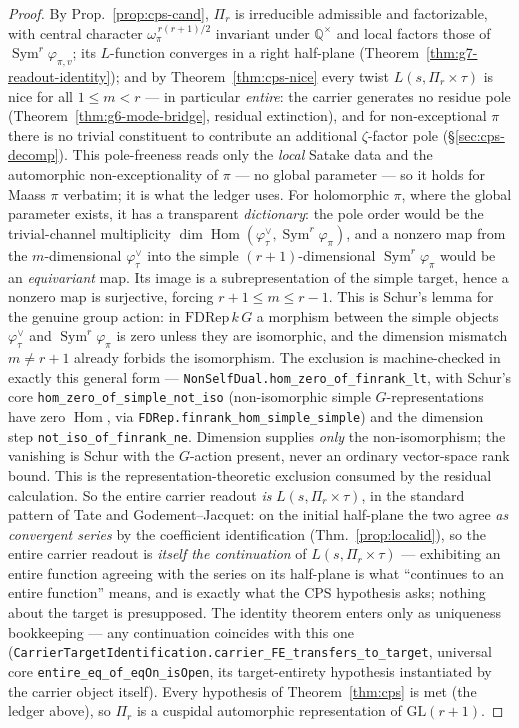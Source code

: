 \documentclass[11pt]{article}
\theoremstyle{definition}
\newcommand{\Sym}{\operatorname{Sym}}
\begin{document}
\begin{proof}
By Prop.~\ref{prop:cps-cand}, $\Pi_r$ is irreducible admissible and factorizable, with central character
$\omega_\pi^{\,r(r+1)/2}$ invariant under $\mathbb Q^\times$ and local factors those of $\Sym^r\varphi_{\pi,v}$;
its $L$-function converges in a right half-plane (Theorem~\ref{thm:g7-readout-identity}); and by Theorem~\ref{thm:cps-nice}
every twist $L(s,\Pi_r\times\tau)$ is nice for all $1\le m<r$ --- in particular \emph{entire}: the carrier
generates no residue pole (Theorem~\ref{thm:g6-mode-bridge}, residual extinction), and for non-exceptional $\pi$ there is
no trivial constituent to contribute an additional $\zeta$-factor pole (\S\ref{sec:cps-decomp}). This
pole-freeness reads only the \emph{local} Satake data and the automorphic non-exceptionality of $\pi$ --- no
global parameter --- so it holds for Maass $\pi$ verbatim; it is what the ledger uses. For holomorphic $\pi$,
where the global parameter exists, it has a transparent \emph{dictionary}: the pole order would be the
trivial-channel multiplicity $\dim\operatorname{Hom}(\varphi_\tau^\vee,\Sym^r\varphi_\pi)$, and a nonzero map from
the $m$-dimensional $\varphi_\tau^\vee$ into the simple $(r+1)$-dimensional $\Sym^r\varphi_\pi$ would be
an \emph{equivariant} map.  Its image is a subrepresentation of the simple target, hence a nonzero
map is surjective, forcing $r+1\le m\le r-1$.  This is Schur's lemma for the genuine group action:
in $\mathrm{FDRep}\,k\,G$ a morphism between the simple objects $\varphi_\tau^\vee$ and
$\Sym^r\varphi_\pi$ is zero unless they are isomorphic, and the dimension mismatch $m\ne r+1$ already
forbids the isomorphism.  The exclusion is machine-checked in exactly this general form ---
\texttt{NonSelfDual.hom\_zero\_of\_finrank\_lt}, with Schur's core
\texttt{hom\_zero\_of\_simple\_not\_iso} (non-isomorphic simple $G$-representations have zero
$\operatorname{Hom}$, via \texttt{FDRep.finrank\_hom\_simple\_simple}) and the dimension step
\texttt{not\_iso\_of\_finrank\_ne}.  Dimension supplies \emph{only} the non-isomorphism; the vanishing
is Schur with the $G$-action present, never an ordinary vector-space rank bound.  This is the
representation-theoretic exclusion consumed by the residual calculation. So the entire carrier readout
\emph{is} $L(s,\Pi_r\times\tau)$, in the standard pattern of Tate and Godement--Jacquet: on the
initial half-plane the two agree \emph{as convergent series} by the coefficient identification
(Thm.~\ref{prop:localid}), so the entire carrier readout is \emph{itself the continuation} of
$L(s,\Pi_r\times\tau)$ --- exhibiting an entire function agreeing with the series on its half-plane
is what ``continues to an entire function'' means, and is exactly what the CPS hypothesis asks;
nothing about the target is presupposed. The identity theorem enters only as uniqueness
bookkeeping --- any continuation coincides with this one
(\texttt{CarrierTargetIdentification.carrier\_FE\_transfers\_to\_target}, universal core
\texttt{entire\_eq\_of\_eqOn\_isOpen}, its target-entirety hypothesis instantiated by the carrier
object itself). Every hypothesis of Theorem~\ref{thm:cps} is met (the ledger above), so $\Pi_r$ is a
cuspidal automorphic representation of $\mathrm{GL}(r+1)$.
\end{proof}
\end{document}
